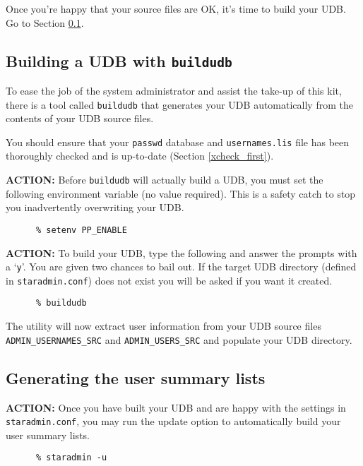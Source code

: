 Once you're happy that your source files are OK, it's time to build your UDB. 
Go to Section \ref{buildudb}.

\subsection{Building a UDB with {\tt buildudb}}
\label{buildudb}

To ease the job of the system administrator and assist the take-up of this kit,
there is a tool called {\tt buildudb} that generates your UDB automatically
from the contents of your UDB source files.

You should ensure that your {\tt passwd} database and {\tt usernames.lis} file
has been thoroughly checked and is up-to-date (Section \ref{xcheck_first}).

{\large\bf ACTION:} Before {\tt buildudb} will actually build a UDB, you must
set the following environment variable (no value required). This is a safety
catch to stop you inadvertently overwriting your UDB.

\begin{verbatim}
      % setenv PP_ENABLE
\end{verbatim}

{\large\bf ACTION:} To build your UDB, type the following and answer the
prompts with a `{\tt y}'. You are given two chances to bail out. If the target 
UDB directory (defined in {\tt staradmin.conf}) does not exist you will be
asked if you want it created.

\begin{verbatim}
      % buildudb
\end{verbatim}

The utility will now extract user information from your UDB source files
{\tt ADMIN\_USERNAMES\_SRC} and {\tt ADMIN\_USERS\_SRC} 
and populate your UDB directory.

\subsection{Generating the user summary lists}

{\large\bf ACTION:} Once you have built your UDB and are happy with the
settings in {\tt staradmin.conf}, you may run the update option to
automatically build your  user summary lists.

\begin{verbatim}
      % staradmin -u
\end{verbatim}

